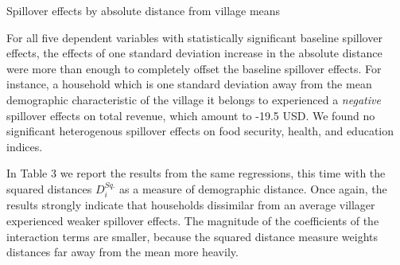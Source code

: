 \documentclass[11pt]{article}
\begin{document}
    \begin{table}[H]
    \centering
    \caption{Spillover effects by absolute distance from village means}
    \end{table}

    For all five dependent variables with statistically significant baseline spillover effects, the effects of one standard deviation increase in the absolute distance were more than enough to completely offset the baseline spillover effects. For instance, a household which is one standard deviation away from the mean demographic characteristic of the village it belongs to experienced a \textit{negative} spillover effects on total revenue, which amount to -19.5 USD. We found no significant heterogenous spillover effects on food security, health, and education indices.

    In Table 3 we report the results from the same regressions, this time with the squared distances $D_i^{Sq.}$ as a measure of demographic distance. Once again, the results strongly indicate that households dissimilar from an average villager experienced weaker spillover effects. The magnitude of the coefficients of the interaction terms are smaller, because the squared distance measure weights distances far away from the mean more heavily.
\end{document}

